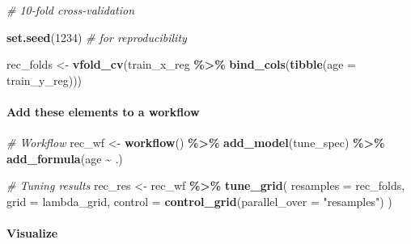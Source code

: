 \documentclass[
]{book}
\newenvironment{Shaded}{\begin{snugshade}}{\end{snugshade}}
\newcommand{\AttributeTok}[1]{\textcolor[rgb]{0.13,0.29,0.53}{#1}}
\newcommand{\CommentTok}[1]{\textcolor[rgb]{0.56,0.35,0.01}{\textit{#1}}}
\newcommand{\DecValTok}[1]{\textcolor[rgb]{0.00,0.00,0.81}{#1}}
\newcommand{\FunctionTok}[1]{\textcolor[rgb]{0.13,0.29,0.53}{\textbf{#1}}}
\newcommand{\NormalTok}[1]{#1}
\newcommand{\OtherTok}[1]{\textcolor[rgb]{0.56,0.35,0.01}{#1}}
\newcommand{\SpecialCharTok}[1]{\textcolor[rgb]{0.81,0.36,0.00}{\textbf{#1}}}
\newcommand{\StringTok}[1]{\textcolor[rgb]{0.31,0.60,0.02}{#1}}
\begin{document}
\begin{Shaded}
\begin{Highlighting}[]
\CommentTok{\# 10{-}fold cross{-}validation}

\FunctionTok{set.seed}\NormalTok{(}\DecValTok{1234}\NormalTok{) }\CommentTok{\# for reproducibility}

\NormalTok{rec\_folds }\OtherTok{\textless{}{-}} \FunctionTok{vfold\_cv}\NormalTok{(train\_x\_reg }\SpecialCharTok{\%\textgreater{}\%} \FunctionTok{bind\_cols}\NormalTok{(}\FunctionTok{tibble}\NormalTok{(}\AttributeTok{age =}\NormalTok{ train\_y\_reg)))}
\end{Highlighting}
\end{Shaded}

\paragraph{Add these elements to a workflow}\label{add-these-elements-to-a-workflow}

\begin{Shaded}
\begin{Highlighting}[]
\CommentTok{\# Workflow}
\NormalTok{rec\_wf }\OtherTok{\textless{}{-}} \FunctionTok{workflow}\NormalTok{() }\SpecialCharTok{\%\textgreater{}\%}
  \FunctionTok{add\_model}\NormalTok{(tune\_spec) }\SpecialCharTok{\%\textgreater{}\%}
  \FunctionTok{add\_formula}\NormalTok{(age }\SpecialCharTok{\textasciitilde{}}\NormalTok{ .)}
\end{Highlighting}
\end{Shaded}

\begin{Shaded}
\begin{Highlighting}[]
\CommentTok{\# Tuning results}
\NormalTok{rec\_res }\OtherTok{\textless{}{-}}\NormalTok{ rec\_wf }\SpecialCharTok{\%\textgreater{}\%}
  \FunctionTok{tune\_grid}\NormalTok{(}
    \AttributeTok{resamples =}\NormalTok{ rec\_folds,}
    \AttributeTok{grid      =}\NormalTok{ lambda\_grid,}
    \AttributeTok{control   =} \FunctionTok{control\_grid}\NormalTok{(}\AttributeTok{parallel\_over =} \StringTok{"resamples"}\NormalTok{)}
\NormalTok{  )}
\end{Highlighting}
\end{Shaded}

\paragraph{Visualize}\label{visualize}
\end{document}
